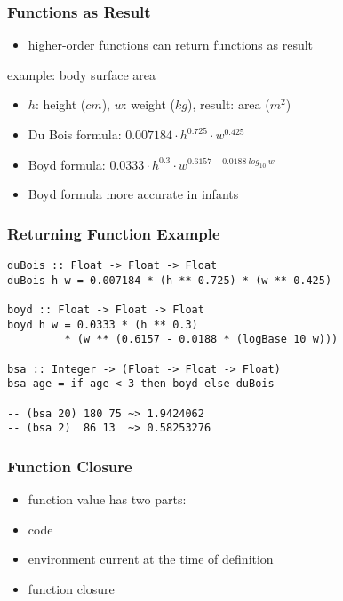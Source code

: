 \documentclass[dvipsnames]{beamer}
\theoremstyle{plain}
\begin{document}
\begin{frame}
  \frametitle{Functions as Result}

  \begin{itemize}
    \item higher-order functions can return functions as result
  \end{itemize}

  \begin{exampleblock}{example: body surface area}
    \begin{itemize}
      \item $h$: height ($cm$), $w$: weight ($kg$), result: area ($m^2$)
      \smallskip
      \item Du Bois formula:
        $0.007184 \cdot h^{0.725} \cdot w^{0.425}$\\
      \smallskip
      \item Boyd formula:
        $0.0333 \cdot h^{0.3} \cdot w^{0.6157 - 0.0188~log_{10}~w}$
      \smallskip
      \item Boyd formula more accurate in infants
    \end{itemize}
  \end{exampleblock}
\end{frame}

\begin{frame}[fragile]
  \frametitle{Returning Function Example}

  \begin{lstlisting}
duBois :: Float -> Float -> Float
duBois h w = 0.007184 * (h ** 0.725) * (w ** 0.425)

boyd :: Float -> Float -> Float
boyd h w = 0.0333 * (h ** 0.3)
         * (w ** (0.6157 - 0.0188 * (logBase 10 w)))

bsa :: Integer -> (Float -> Float -> Float)
bsa age = if age < 3 then boyd else duBois

-- (bsa 20) 180 75 ~> 1.9424062
-- (bsa 2)  86 13  ~> 0.58253276
  \end{lstlisting}
\end{frame}

\begin{frame}[fragile]
  \frametitle{Function Closure}

  \begin{itemize}
    \item function value has two parts:

    \medskip
    \item code
    \item environment current at the time of definition

    \medskip
    \item function \alert{closure}
  \end{itemize}
\end{frame}
\end{document}
